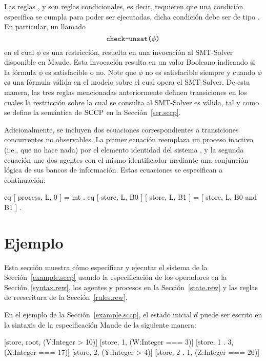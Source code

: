 Las reglas \cde{[ask]},  y  son reglas condicionales, es decir, requieren que una condici\'on especifica se cumpla para poder ser ejecutadas, dicha condici\'on debe ser de tipo . En particular, un llamado \[\textnormal{\texttt{check-unsat(}}\phi\textnormal{\texttt{)}} \] en el cual $\phi$ es una restricci\'on, resuelta en una invocaci\'on al SMT-Solver disponible en Maude. Esta invocaci\'on resulta en un valor Booleano indicando si la f\'ormula $\phi$ es satisfacible o no. Note que $\phi$ no es satisfacible siempre y cuando $\phi$ es una f\'ormula v\'alida en el modelo sobre el cual opera el SMT-Solver. De esta manera, las tres reglas mencionadas anteriormente definen transiciones en los cuales la restricci\'on sobre la cual se consulta al SMT-Solver es v\'alida, tal y como se define la sem\'antica de $\textnormal{SCCP}$ en la Secci\'on~\ref{ser.sccp}.

Adicionalmente, se incluyen dos ecuaciones correspondientes a transiciones concurrentes no observables. La primer ecuaci\'on reemplaza un proceso inactivo (i.e., que no hace nada) por el elemento identidad del sistema , y la segunda ecuaci\'on une dos agentes con el mismo identificador mediante una conjunci\'on l\'ogica de sus bancos de informaci\'on. Estas ecuaciones se especifican a continuaci\'on:

\begin{maude}
  eq [ process, L, 0 ]
   = mt .
  eq [ store, L, B0 ] [ store, L, B1 ]
   = [ store, L, B0 and B1 ] .
\end{maude}

\section{Ejemplo}
\label{example.rew}

Esta secci\'on muestra c\'omo especificar y ejecutar el sistema de la Secci\'on~\ref{example.sccp} usando la especificaci\'on de los operadores en la Secci\'on~\ref{syntax.rew}, los agentes y procesos en la Secci\'on~\ref{state.rew} y las reglas de reescritura de la Secci\'on~\ref{rules.rew}.

En el ejemplo de la Secci\'on~\ref{example.sccp}, el estado inicial $d$ puede ser escrito en la sintaxis de la especificaci\'on Maude de la siguiente manera:

\begin{maude}
{ [store, root, (V:Integer > 10)]
  [store, 1, (W:Integer === 3)]
  [store, 1 . 3, (X:Integer === 17)]
  [store, 2, (Y:Integer > 4)]
  [store, 2 . 1, (Z:Integer === 20)] } 
\end{maude}

